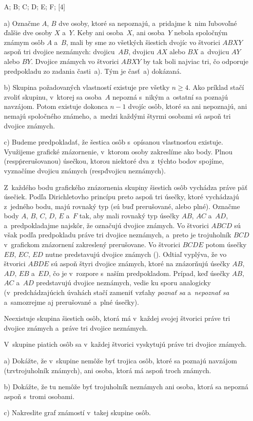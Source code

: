 {%
\fontplace
\tpoint A; \tpoint B; \lpoint C; \bpoint D;
\bpoint E; \rbpoint F;
[4] \hfil\Obr

a) Označme $A$, $B$ dve osoby, ktoré sa nepoznajú, a~pridajme k~nim ľubovoľné
ďalšie dve osoby $X$ a~$Y$. Keby ani osoba~$X$, ani osoba~$Y$ nebola
spoločným známym osôb $A$ a~$B$, mali by sme zo všetkých šiestich dvojíc vo štvorici
$ABXY$ aspoň tri dvojice neznámych: dvojicu~$AB$, dvojicu $AX$ alebo $BX$
a~dvojicu $AY$ alebo $BY$. Dvojice známych vo štvorici $ABXY$ by tak boli
najviac tri, čo odporuje predpokladu zo zadania časti~a). Tým je časť~a) dokázaná.

\smallskip
b) Skupina požadovaných vlastností existuje pre všetky $n\ge4$. Ako príklad
stačí zvoliť skupinu, v~ktorej sa osoba~$A$ nepozná s~nikým a~ostatní sa poznajú
navzájom. Potom existuje dokonca $n-1$ dvojíc osôb, ktoré sa ani nepoznajú, ani nemajú
spoločného známeho, a~medzi každými štyrmi osobami sú aspoň tri dvojice známych.

\smallskip
c) Budeme predpokladať, že šestica osôb s~opísanou vlastnosťou existuje.
Využijeme grafické znázornenie, v~ktorom osoby zakreslíme ako body. Plnou
(resp\. prerušovanou) úsečkou, ktorou niektoré dva z~týchto bodov spojíme,
vyznačíme dvojicu známych (resp\. dvojicu neznámych).

Z~každého bodu grafického znázornenia skupiny šiestich osôb vychádza práve
päť úsečiek. Podľa Dirichletovho
princípu preto aspoň tri úsečky, ktoré vychádzajú z~jedného bodu, majú rovnaký typ
(sú buď prerušované, alebo plné). Označme body $A$, $B$, $C$, $D$, $E$ a~$F$
tak, aby mali rovnaký typ úsečky $AB$, $AC$ a~$AD$, a~predpokladajme
najskôr, že označujú dvojice známych. Vo štvorici $ABCD$
sú však podľa predpokladu práve tri dvojice neznámych, a~preto je trojuholník
$BCD$ v~grafickom znázornení zakreslený prerušovane. Vo štvorici $BCDE$ potom
úsečky $EB$, $EC$, $ED$ nutne predstavujú dvojice známych (\obr).
Odtiaľ vyplýva, že vo štvorici $ABDE$ sú aspoň štyri dvojice
známych, ktoré na  znázorňujú úsečky $AB$, $AD$, $EB$ a~$ED$, čo je v~rozpore
s~naším predpokladom.
Prípad, keď úsečky $AB$, $AC$ a~$AD$ predstavujú dvojice neznámych, vedie
ku sporu analogicky (v~predchádzajúcich úvahách stačí zameniť
vzťahy {\it poznať sa\/} a~{\it nepoznať sa\/} a~samozrejme aj prerušované
a~plné úsečky).

\inspicture{}

\zaver
Neexistuje skupina šiestich osôb, ktorá má v~každej svojej
štvorici práve tri dvojice známych a~práve tri dvojice neznámych.

V~skupine piatich osôb sa v~každej štvorici vyskytujú práve tri dvojice známych.
\item{a)} Dokážte, že v~skupine nemôže byť trojica osôb, ktoré sa poznajú
          navzájom (tzv\. trojuholník známych), ani osoba, ktorá má aspoň troch
          známych.
\item{b)} Dokážte, že tu nemôže byť trojuholník neznámych ani osoba,
          ktorá sa nepozná aspoň s~tromi osobami.
\item{c)} %
          Nakreslite graf známostí v~takej skupine osôb.
}

